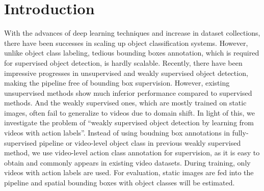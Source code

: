 \section{Introduction}
\label{sec:intro}

With the advances of deep learning techniques and increase in dataset collections, there have been successes in scaling up object classification systems. However, unlike object class labeling, tedious bounding boxes annotation, which is required for supervised object detection, is hardly scalable. 
Recently, there have been impressive progresses in unsupervised and weakly supervised object detection, making the pipeline free of bounding box supervision. However, existing unsupervised methods show much inferior performance compared to supervised methods. And the weakly supervised ones, which are mostly trained on static images, often fail to generalize to videos due to domain shift. In light of this, we investigate the problem of ``weakly supervised object detection by learning from videos with action labels''. Instead of using boudning box annotations in fully-supervised pipeline or video-level object class in previous weakly supervised method, we use video-level action class annotation for supervision, as it is easy to obtain and commonly appears in existing video datasets. During training, only videos with action labels are used. For evaluation, static images are fed into the pipeline and spatial bounding boxes with object classes will be estimated.


